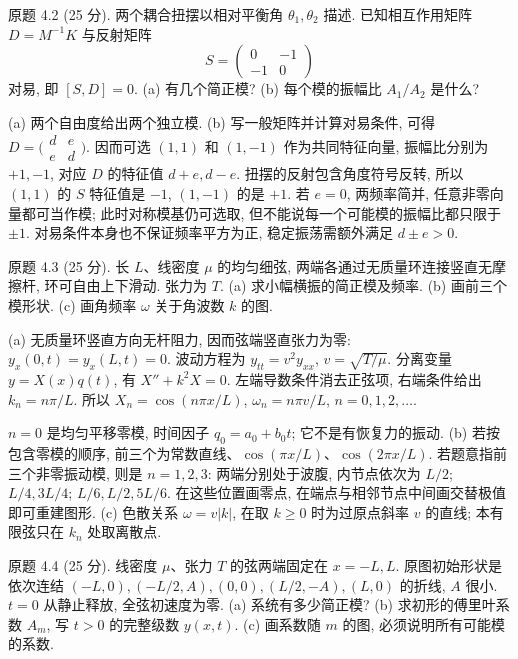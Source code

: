 \begin{exercise}\label{ps:4.2}
原题 4.2 (25 分). 两个耦合扭摆以相对平衡角 $\theta_1,\theta_2$ 描述. 已知相互作用矩阵 $D=M^{-1}K$ 与反射矩阵
\[
S=\begin{pmatrix}0&-1\\-1&0\end{pmatrix}
\]
对易, 即 $[S,D]=0$. (a) 有几个简正模? (b) 每个模的振幅比 $A_1/A_2$ 是什么?
\end{exercise}
\begin{solution}
(a) 两个自由度给出两个独立模. (b) 写一般矩阵并计算对易条件, 可得 $D=\bigl(\begin{smallmatrix}d&e\\e&d\end{smallmatrix}\bigr)$. 因而可选 $(1,1)$ 和 $(1,-1)$ 作为共同特征向量, 振幅比分别为 $+1,-1$, 对应 $D$ 的特征值 $d+e,d-e$. 扭摆的反射包含角度符号反转, 所以 $(1,1)$ 的 $S$ 特征值是 $-1$, $(1,-1)$ 的是 $+1$. 若 $e=0$, 两频率简并, 任意非零向量都可当作模; 此时对称模基仍可选取, 但不能说每一个可能模的振幅比都只限于 $\pm1$. 对易条件本身也不保证频率平方为正, 稳定振荡需额外满足 $d\pm e>0$.
\end{solution}
\begin{exercise}\label{ps:4.3}
原题 4.3 (25 分). 长 $L$、线密度 $\mu$ 的均匀细弦, 两端各通过无质量环连接竖直无摩擦杆, 环可自由上下滑动. 张力为 $T$. (a) 求小幅横振的简正模及频率. (b) 画前三个模形状. (c) 画角频率 $\omega$ 关于角波数 $k$ 的图.
\end{exercise}
\begin{solution}
(a) 无质量环竖直方向无杆阻力, 因而弦端竖直张力为零: $y_x(0,t)=y_x(L,t)=0$. 波动方程为 $y_{tt}=v^2y_{xx}$, $v=\sqrt{T/\mu}$. 分离变量 $y=X(x)q(t)$, 有 $X''+k^2X=0$. 左端导数条件消去正弦项, 右端条件给出 $k_n=n\pi/L$. 所以 $X_n=\cos(n\pi x/L)$, $\omega_n=n\pi v/L$, $n=0,1,2,\ldots$.

$n=0$ 是均匀平移零模, 时间因子 $q_0=a_0+b_0t$; 它不是有恢复力的振动. (b) 若按包含零模的顺序, 前三个为常数直线、$\cos(\pi x/L)$、$\cos(2\pi x/L)$. 若题意指前三个非零振动模, 则是 $n=1,2,3$: 两端分别处于波腹, 内节点依次为 $L/2$; $L/4,3L/4$; $L/6,L/2,5L/6$. 在这些位置画零点, 在端点与相邻节点中间画交替极值即可重建图形. (c) 色散关系 $\omega=v|k|$, 在取 $k\ge0$ 时为过原点斜率 $v$ 的直线; 本有限弦只在 $k_n$ 处取离散点.
\end{solution}
\begin{exercise}\label{ps:4.4}
原题 4.4 (25 分). 线密度 $\mu$、张力 $T$ 的弦两端固定在 $x=-L,L$. 原图初始形状是依次连结 $(-L,0),(-L/2,A),(0,0),(L/2,-A),(L,0)$ 的折线, $A$ 很小. $t=0$ 从静止释放, 全弦初速度为零. (a) 系统有多少简正模? (b) 求初形的傅里叶系数 $A_m$, 写 $t>0$ 的完整级数 $y(x,t)$. (c) 画系数随 $m$ 的图, 必须说明所有可能模的系数.
\end{exercise}
